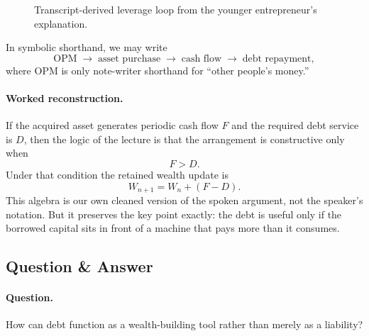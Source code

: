 \begin{figure}[h]
\centering
{}
\caption{Transcript-derived leverage loop from the younger entrepreneur's explanation.}
\end{figure}

In symbolic shorthand, we may write
\begin{equation}
\text{OPM}
\;\to\;
\text{asset purchase}
\;\to\;
\text{cash flow}
\;\to\;
\text{debt repayment},
\end{equation}
where \(\text{OPM}\) is only note-writer shorthand for ``other people's money.''

\paragraph{Worked reconstruction.} If the acquired asset generates periodic cash flow \(F\) and the required debt service is \(D\), then the logic of the lecture is that the arrangement is constructive only when
\begin{equation}
F>D.
\end{equation}
Under that condition the retained wealth update is
\begin{equation}
W_{n+1}=W_n+(F-D).
\end{equation}
This algebra is our own cleaned version of the spoken argument, not the speaker's notation. But it preserves the key point exactly: the debt is useful only if the borrowed capital sits in front of a machine that pays more than it consumes.

\subsection{Question \& Answer}

\paragraph{Question.} How can debt function as a wealth-building tool rather than merely as a liability?

